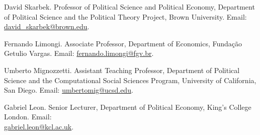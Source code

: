 \documentclass[a4paper]{article}
\renewenvironment{itemize}{
	\begin{list}{}{
			\setlength{\leftmargin}{1.5em}
		}
		}{
	\end{list}
}
\begin{document}
\begin{itemize}

\item David Skarbek. Professor of Political Science and Political Economy, Department of Political Science and the Political Theory Project, Brown University. Email: \href{mailto:davidskarbek@gmail.com}{david\_skarbek@brown.edu}.
\item Fernando Limongi. Associate Professor, Department of Economics, Fundação Getulio Vargas. Email: \href{mailto:fernando.limongi@fgv.br}{fernando.limongi@fgv.br}.
\item Umberto Mignozzetti. Assistant Teaching Professor, Department of Political Science and the Computational Social Sciences Program, University of California, San Diego. Email: \href{mailto:umbertomig@ucsd.edu}{umbertomig@ucsd.edu}.
\item Gabriel Leon. Senior Lecturer, Department of Political Economy, King's College London. Email: \\ \href{mailto:gabriel.leon@kcl.ac.uk}{gabriel.leon@kcl.ac.uk}.
\end{itemize}

	\bigskip
\end{document}

